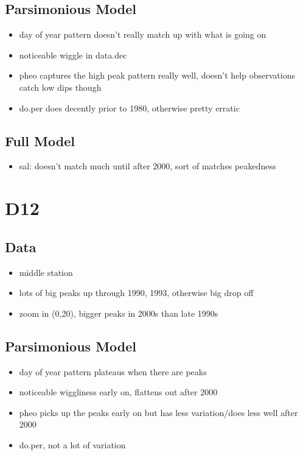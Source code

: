 \documentclass[12pt]{amsart}
\begin{document}
\subsection{Parsimonious Model}
\begin{itemize}
\item day of year pattern doesn't really match up with what is going on
\item noticeable wiggle in data.dec
\item pheo captures the high peak pattern really well, doesn't help observations catch low dips though
\item do.per does decently prior to 1980, otherwise pretty erratic
\end{itemize}
\subsection{Full Model}
\begin{itemize}
\item sal: doesn't match much until after 2000, sort of matches peakedness
\end{itemize}


\section{D12}
\subsection{Data}
\begin{itemize}
\item middle station
\item lots of big peaks up through 1990, 1993, otherwise big drop off
\item zoom in (0,20), bigger peaks in 2000s than late 1990s
\end{itemize}
\subsection{Parsimonious Model}
\begin{itemize}
\item day of year pattern plateaus when there are peaks
\item noticeable wiggliness early on, flattens out after 2000
\item pheo picks up the peaks early on but has less variation/does less well after 2000
\item do.per, not a lot of variation
\end{itemize}
\end{document}
